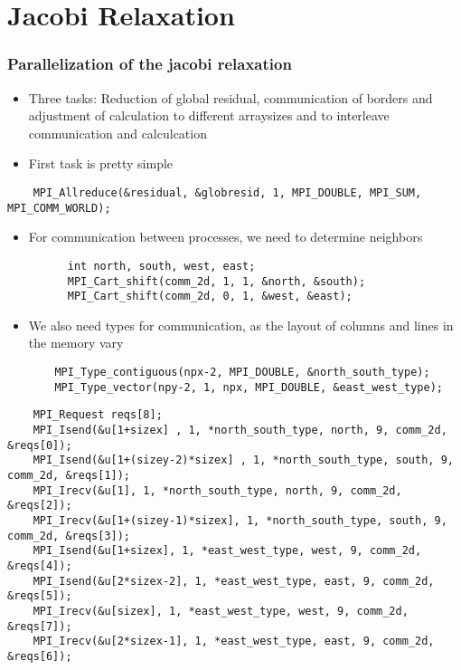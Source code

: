 \section{Jacobi Relaxation}
\begin{frame}
  \frametitle{Parallelization of the jacobi relaxation}
  \begin{itemize}
  \item Three tasks: Reduction of global residual, communication of borders and adjustment of calculation to different arraysizes and to interleave communication and calculcation
  \item First task is pretty simple
  \end{itemize}
\end{frame}

\begin{frame}[fragile]
  \begin{lstlisting}
    MPI_Allreduce(&residual, &globresid, 1, MPI_DOUBLE, MPI_SUM, MPI_COMM_WORLD);
  \end{lstlisting}
\end{frame}



\begin{frame}[fragile]
  \begin{itemize}
  \item For communication between processes, we need to determine neighbors
    \begin{lstlisting}
      int north, south, west, east;
      MPI_Cart_shift(comm_2d, 1, 1, &north, &south);
      MPI_Cart_shift(comm_2d, 0, 1, &west, &east);
    \end{lstlisting}
  \item We also need types for communication, as the layout of columns and lines in the memory vary
    \begin{lstlisting}
    MPI_Type_contiguous(npx-2, MPI_DOUBLE, &north_south_type);
    MPI_Type_vector(npy-2, 1, npx, MPI_DOUBLE, &east_west_type);
    \end{lstlisting}
  \end{itemize}
\end{frame}

\begin{frame}[fragile]
  \begin{lstlisting}
    MPI_Request reqs[8];
    MPI_Isend(&u[1+sizex] , 1, *north_south_type, north, 9, comm_2d, &reqs[0]);
    MPI_Isend(&u[1+(sizey-2)*sizex] , 1, *north_south_type, south, 9, comm_2d, &reqs[1]);
    MPI_Irecv(&u[1], 1, *north_south_type, north, 9, comm_2d, &reqs[2]);
    MPI_Irecv(&u[1+(sizey-1)*sizex], 1, *north_south_type, south, 9, comm_2d, &reqs[3]);
    MPI_Isend(&u[1+sizex], 1, *east_west_type, west, 9, comm_2d, &reqs[4]);
    MPI_Isend(&u[2*sizex-2], 1, *east_west_type, east, 9, comm_2d, &reqs[5]);
    MPI_Irecv(&u[sizex], 1, *east_west_type, west, 9, comm_2d, &reqs[7]);
    MPI_Irecv(&u[2*sizex-1], 1, *east_west_type, east, 9, comm_2d, &reqs[6]);
  \end{lstlisting}
\end{frame}

